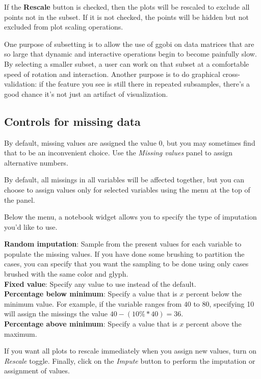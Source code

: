 \documentclass[11pt]{article}
\begin{document}
If the {\bf Rescale} button is checked, then the plots will be
rescaled to exclude all points not in the subset.  If it is
not checked, the points will be hidden but not excluded from
plot scaling operations.

One purpose of subsetting is to allow the use of ggobi on data matrices
that are so large that dynamic and interactive operations begin to
become painfully slow.  By selecting a smaller subset, a user can
work on that subset at a comfortable speed of rotation and
interaction.  Another purpose is to do graphical cross-validation:
if the feature you see is still there in repeated subsamples, there's
a good chance it's not just an artifact of visualization.

\subsection{Controls for missing data}
%
By default, missing values are assigned the value $0$, but you
may sometimes find that to be an inconvenient choice.  Use the
{\em Missing values} panel to assign alternative numbers.

By default, all missings in all variables will be affected
together, but you can choose to assign values only for selected
variables using the menu at the top of the panel.

Below the menu, a notebook widget allows you to specify the
type of imputation you'd like to use.

{\bf Random imputation}: Sample from the present values for each variable
  to populate the missing values.  If you have done some brushing to
  partition the cases, you can specify that you want the sampling to be
  done using only cases brushed with the same color and glyph.
\\{\bf Fixed value}: Specify any value to use instead of the default.
\\{\bf Percentage below minimum}: Specify a value that is $x$ percent
  below the minimum value.  For example, if the variable ranges from
 $40$ to $80$, specifying 10 will assign the missings the value $40 - (10\%
 * 40) = 36$.
\\{\bf Percentage above minimum}: Specify a value that is $x$ percent
above the maximum.

If you want all plots to rescale immediately when you assign new
values, turn on {\em Rescale} toggle.  Finally, click on the {\em Impute}
button to perform the imputation or assignment of values.

%
%
\end{document}
